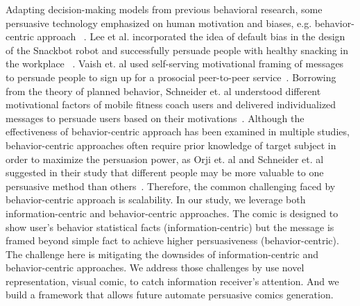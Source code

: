 Adapting decision-making models from previous behavioral research, some persuasive technology emphasized on human motivation and biases, e.g. behavior-centric approach ~\cite{LeeKF11}. Lee et al. incorporated the idea of default bias in the design of the Snackbot robot and successfully persuade people with healthy snacking in the workplace ~\cite{LeeKF11}. Vaish et. al used self-serving motivational framing of messages to persuade people to sign up for a prosocial peer-to-peer service~\cite{vaish2018s}. Borrowing from the theory of planned behavior, Schneider et. al understood different motivational factors of mobile fitness coach users and delivered individualized messages to persuade users based on their motivations~\cite{schneider2016understanding}. Although the effectiveness of behavior-centric approach has been examined in multiple studies, behavior-centric approaches often require prior knowledge of target subject in order to maximize the persuasion power, as Orji et. al and Schneider et. al suggested in their study that different people may be more valuable to one persuasive method than others~\cite{schneider2016understanding,orji2014developing}. Therefore, the common challenging faced by behavior-centric approach is scalability. In our study, we leverage both information-centric and behavior-centric approaches. The comic is designed to show user's behavior statistical facts (information-centric) but the message is framed beyond simple fact to achieve higher persuasiveness (behavior-centric). The challenge here is mitigating the downsides of information-centric and behavior-centric approaches. We address those challenges by use novel representation, visual comic, to catch information receiver's attention. And we build a framework that allows future automate persuasive comics generation.

